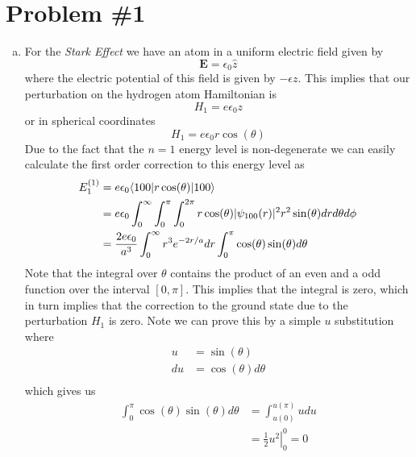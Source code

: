 \documentclass[11pt]{article}
\numberwithin{equation}{section}
\begin{document}


\section{Problem \#1}
\begin{enumerate}[(a)]
\item
For the \emph{Stark Effect} we have an atom in a uniform electric field given by
$$\mathbf{E} = \epsilon_0\hat{z}$$
where the electric potential of this field is given by $-\epsilon z$. This implies that our perturbation on the hydrogen atom Hamiltonian is
$$H_1 = e\epsilon_0 z$$
or in spherical coordinates
$$H_1 = e\epsilon_0 r\cos(\theta)$$
Due to the fact that the $n=1$ energy level is non-degenerate we can easily calculate the first order correction to this energy level as
\begin{align*}
E_1^{(1)} &= e\epsilon_0\langle{100}|r\cos(\theta)|{100}\rangle\\
&= e\epsilon_0\int_{0}^{\infty}\int_{0}^{\pi}\int_{0}^{2\pi}r\cos(\theta)|\psi_{100}(r)|^2r^2\sin(\theta)drd\theta d\phi\\
&= \frac{2e\epsilon_0}{a^3}\int_{0}^{\infty}r^3e^{-2r/a}dr\int_{0}^{\pi}\cos(\theta)\sin(\theta)d\theta
\end{align*}
Note that the integral over $\theta$ contains the product of an even and a odd function over the interval $[0,\pi]$. This implies that the integral is zero, which in turn implies that the correction to the ground state due to the perturbation $H_1$ is zero. Note we can prove this by a simple $u$ substitution where
\begin{align*}
u &= \sin(\theta)\\
du &= \cos(\theta)d\theta\\
\end{align*}
which gives us
\begin{align*}
\int_{0}^{\pi}\cos(\theta)\sin(\theta)d\theta &= \int_{u(0)}^{u(\pi)}udu\\
&= \left.\frac{1}{2}u^2\right|_{0}^{0} = 0
\end{align*}


\end{enumerate}
\end{document}
